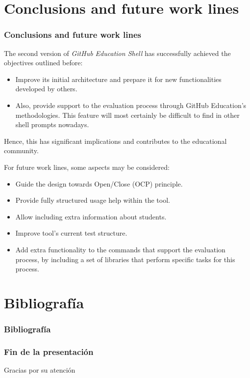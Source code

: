 \documentclass{beamer}
\begin{document}
\section{Conclusions and future work lines}
\begin{frame}[allowframebreaks]
  \frametitle{Conclusions and future work lines}
  The second version of {\it GitHub Education Shell} has successfully achieved the objectives outlined before:
  \begin{itemize}
    \item  Improve its initial architecture and prepare it for new functionalities developed by others.
    \item  Also, provide support to the evaluation process through GitHub Education’s methodologies. This feature will most certainly be difficult to find in other shell prompts nowadays.
  \end{itemize}
  Hence, this has significant implications and contributes to the educational community.

  \framebreak

  For future work lines, some aspects may be considered:
  \begin{itemize}
    \item Guide the design towards Open/Close (OCP) principle.
    \item Provide fully structured usage help within the tool.
    \item Allow including extra information about students.
    \item Improve tool's current test structure.
    \item Add extra functionality to the commands that support the evaluation process, by including a set of libraries
    that perform specific tasks for this process.
  \end{itemize}
\end{frame}


\section{Bibliografía}
\begin{frame}[allowframebreaks]
  \frametitle{Bibliografía}
  
  
  \nocite{*}
\end{frame}

\begin{frame}
  \frametitle{Fin de la presentación}
  \begin{center}
    \Huge{Gracias por su atención}
  \end{center}
\end{frame}
\end{document}
